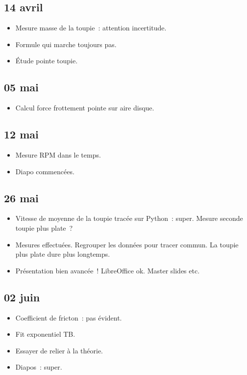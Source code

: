 \documentclass[a4paper, 11pt, final, garamond]{book}
\begin{document}
\subsection{14 avril}
\begin{itemize}
  \item Mesure masse de la toupie~: attention incertitude.
  \item Formule qui marche toujours pas.
  \item Étude pointe toupie.
\end{itemize}

\subsection{05 mai}
\begin{itemize}
  \item Calcul force frottement pointe sur aire disque.
\end{itemize}

\subsection{12 mai}
\begin{itemize}
  \item Mesure RPM dans le temps.
  \item Diapo commencées.
\end{itemize}

\subsection{26 mai}
\begin{itemize}
  \item Vitesse de moyenne de la toupie tracée sur Python~: super. Mesure seconde
    toupie plus plate~?
  \item Mesures effectuées. Regrouper les données pour tracer commun. La toupie
    plus plate dure plus longtemps.
  \item Présentation bien avancée~! LibreOffice ok. Master slides etc.
\end{itemize}

\subsection{02 juin}
\begin{itemize}
  \item Coefficient de fricton~: pas évident.
  \item Fit exponentiel TB.
  \item Essayer de relier à la théorie.
  \item Diapos~: super.
\end{itemize}
\end{document}
